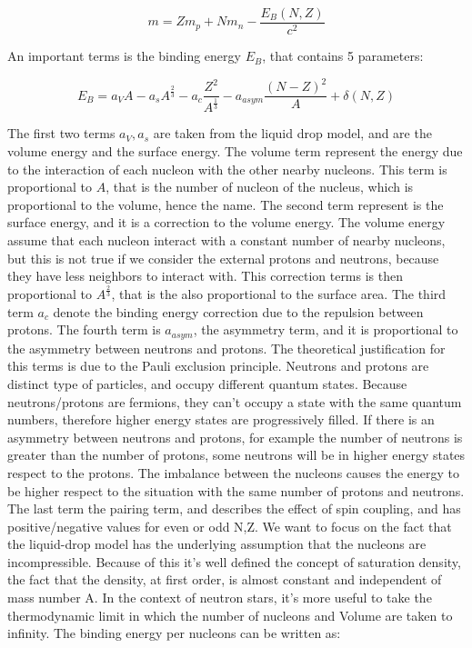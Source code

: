 \begin{equation}
m = Zm_{p} + Nm_{n} - \frac{E_{B}(N,Z)}{c^{2}}
\end{equation}

An important terms is the binding energy $E_{B}$, that contains 5 parameters:

\begin{equation}
E_{B} = a_{V}A -  a_{s}A^{\frac{2}{3}} - a_{c}\dfrac{Z^{2}}{A^{\frac{1}{3}}} -a_{asym}\dfrac{(N - Z)^{2}}{A} + \delta(N,Z)
\end{equation}

The first two terms $a_{V},a_{s}$ are taken from the liquid drop model, and are the volume energy and the surface energy. The volume term represent the energy due to the interaction of each nucleon with the other nearby nucleons. This term is proportional to $A$, that is the number of nucleon of the nucleus, which is proportional to the volume, hence the name. The second term represent is the surface energy, and it is a correction to the volume energy. The volume energy assume that each nucleon interact with a constant number of nearby nucleons, but this is not true if we consider the external protons and neutrons, because they have less neighbors to interact with. This correction terms is then proportional to $A^{\frac{2}{3}}$, that is the also proportional to the surface area. 
The third term $a_{c}$ denote the binding energy correction due to the repulsion between protons. The fourth term is $a_{asym}$, the asymmetry term, and it is proportional to the asymmetry between neutrons and protons. The theoretical justification for this terms is due to the Pauli exclusion principle. Neutrons and protons are distinct type of particles, and occupy different quantum states. Because neutrons/protons are fermions, they can't occupy a state with the same quantum numbers, therefore higher energy states are progressively filled. If there is an asymmetry between neutrons and protons, for example the number of neutrons is greater than the number of protons, some neutrons will be in higher energy states respect to the protons. The imbalance between the nucleons causes the energy to be higher respect to the situation with the same number of protons and neutrons. 
The last term the pairing term, and describes the effect of spin coupling, and has positive/negative values for even or odd N,Z. 
We want to focus on the fact that the liquid-drop model has the underlying assumption that the nucleons are incompressible. Because of this it's well defined the concept of saturation density, the fact that the density, at first order, is almost constant and independent of mass number A.
In the context of neutron stars, it's more useful to take the thermodynamic limit in which the number of nucleons and Volume are taken to infinity. The binding energy per nucleons can be written as:

